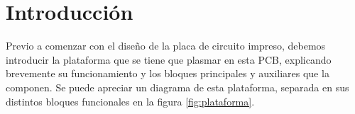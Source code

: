 \section{Introducción} \label{introduccion}
\thispagestyle{plain}

\divider

Previo a comenzar con el diseño de la placa de circuito impreso, debemos introducir la plataforma que se tiene que plasmar en esta PCB, explicando brevemente su funcionamiento y los bloques principales y auxiliares que la componen. Se puede apreciar un diagrama de esta plataforma, separada en sus distintos bloques funcionales en la figura \ref{fig:plataforma}.\\


